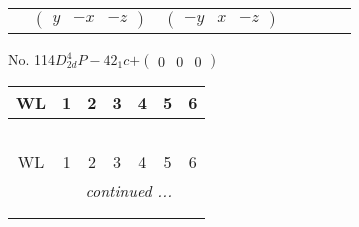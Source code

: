 \documentclass[fleqn,9pt,landscape]{jsarticle}
\begin{document}
\begin{center}
\begin{longtable}{ccccccc}
& $ \begin{pmatrix} y & - x & - z \end{pmatrix} $ & $ \begin{pmatrix} - y & x & - z \end{pmatrix} $ & $  $ & $  $ & $  $ & $  $ \\
\end{longtable}
\end{center}
\newpage
No. 114\quad$D_{2d}^{4}$\quad$P-42_1c$\quad[ tetragonal ]\quad$+\begin{pmatrix} 0 & 0 & 0 \end{pmatrix}$
\begin{center}
\renewcommand{\arraystretch}{1.2}
\begin{longtable}{ccccccc}
 \hline \hline
WL & 1 & 2 & 3 & 4 & 5 & 6 \\ \hline \endfirsthead

\multicolumn{6}{l}{\tablename\ \thetable{}} \\
 \hline \hline
WL & 1 & 2 & 3 & 4 & 5 & 6 \\ \hline \endhead

 \hline \hline
\multicolumn{6}{r}{\footnotesize\it continued ...} \\ \endfoot

 \hline \hline
\multicolumn{6}{r}{} \\ \endlastfoot


\end{longtable}
\end{center}
\end{document}
